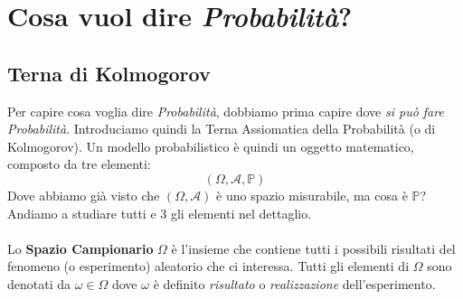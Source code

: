 \chapter{Cosa vuol dire \textit{Probabilità}?}

\section{Terna di Kolmogorov}
Per capire cosa voglia dire \textit{Probabilità}, dobbiamo prima capire dove \textit{si può fare Probabilità}. Introduciamo quindi la Terna Assiomatica della Probabilità (o di Kolmogorov). Un modello probabilistico è quindi un oggetto matematico, composto da tre elementi:
\[(\Omega, \mathcal{A}, \mathbb{P})\]
Dove abbiamo già visto che $(\Omega, \mathcal{A})$ è uno spazio misurabile, ma cosa è $\mathbb{P}$?\\
Andiamo a studiare tutti e 3 gli elementi nel dettaglio.\\
\\
Lo \textbf{Spazio Campionario} $\Omega$ è l'insieme che contiene tutti i possibili risultati del fenomeno (o esperimento) aleatorio che ci interessa. Tutti gli elementi di $\Omega$ sono denotati da $\omega \in \Omega$ dove $\omega$ è definito \textit{risultato} o \textit{realizzazione} dell'esperimento.

